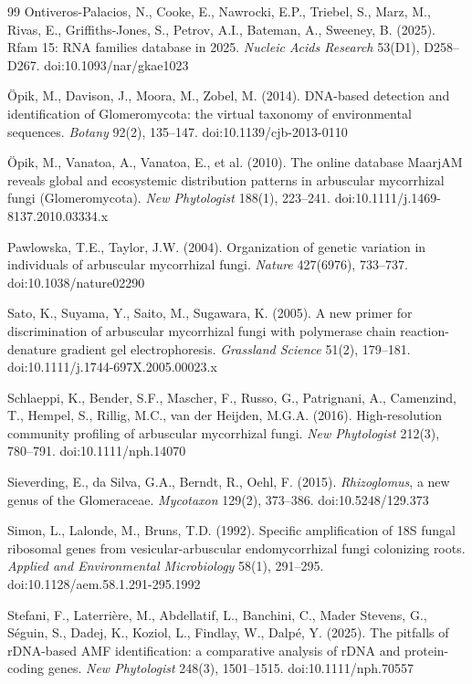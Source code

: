 \documentclass[11pt]{article}
\begin{document}
\begin{thebibliography}{99}
Ontiveros-Palacios, N., Cooke, E., Nawrocki, E.P., Triebel, S., Marz, M., Rivas, E., Griffiths-Jones, S., Petrov,
A.I., Bateman, A., Sweeney, B. (2025). Rfam 15: RNA families database in 2025. \emph{Nucleic Acids Research}
53(D1), D258--D267. doi:10.1093/nar/gkae1023

\"Opik, M., Davison, J., Moora, M., Zobel, M. (2014). DNA-based detection and identification of
Glomeromycota: the virtual taxonomy of environmental sequences. \emph{Botany} 92(2), 135--147. doi:10.1139/cjb-2013-0110

\"Opik, M., Vanatoa, A., Vanatoa, E., et al. (2010). The online database MaarjAM
reveals global and ecosystemic distribution patterns in arbuscular mycorrhizal
fungi (Glomeromycota). \emph{New Phytologist} 188(1), 223--241. doi:10.1111/j.1469-8137.2010.03334.x

Pawlowska, T.E., Taylor, J.W. (2004). Organization of genetic variation in individuals of
arbuscular mycorrhizal fungi. \emph{Nature} 427(6976), 733--737. doi:10.1038/nature02290

Sato, K., Suyama, Y., Saito, M., Sugawara, K. (2005). A new primer for discrimination of
arbuscular mycorrhizal fungi with polymerase chain reaction-denature gradient gel
electrophoresis. \emph{Grassland Science} 51(2), 179--181. doi:10.1111/j.1744-697X.2005.00023.x

Schlaeppi, K., Bender, S.F., Mascher, F., Russo, G., Patrignani, A., Camenzind, T., Hempel, S., Rillig, M.C.,
van der Heijden, M.G.A. (2016). High-resolution community profiling of arbuscular mycorrhizal fungi.
\emph{New Phytologist} 212(3), 780--791. doi:10.1111/nph.14070

Sieverding, E., da Silva, G.A., Berndt, R., Oehl, F. (2015). \emph{Rhizoglomus}, a new genus of the Glomeraceae.
\emph{Mycotaxon} 129(2), 373--386. doi:10.5248/129.373

Simon, L., Lalonde, M., Bruns, T.D. (1992). Specific amplification of 18S fungal ribosomal
genes from vesicular-arbuscular endomycorrhizal fungi colonizing roots. \emph{Applied and
Environmental Microbiology} 58(1), 291--295. doi:10.1128/aem.58.1.291-295.1992

Stefani, F., Laterri\`ere, M., Abdellatif, L., Banchini, C., Mader Stevens, G., S\'eguin, S.,
Dadej, K., Koziol, L., Findlay, W., Dalp\'e, Y. (2025). The pitfalls of rDNA-based AMF
identification: a comparative analysis of rDNA and protein-coding genes.
\emph{New Phytologist} 248(3), 1501--1515. doi:10.1111/nph.70557


\end{thebibliography}
\end{document}
